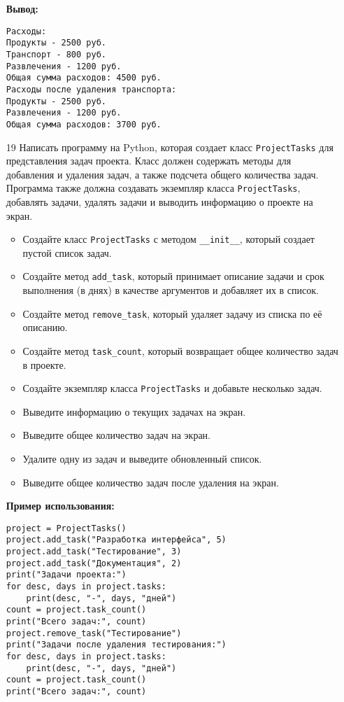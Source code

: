 \begin{enumerate}
\textbf{Вывод:}
\begin{verbatim}
Расходы:
Продукты - 2500 руб.
Транспорт - 800 руб.
Развлечения - 1200 руб.
Общая сумма расходов: 4500 руб.
Расходы после удаления транспорта:
Продукты - 2500 руб.
Развлечения - 1200 руб.
Общая сумма расходов: 3700 руб.
\end{verbatim}

\item[19] Написать программу на Python, которая создает класс \texttt{ProjectTasks} для представления задач проекта. Класс должен содержать методы для добавления и удаления задач, а также подсчета общего количества задач. Программа также должна создавать экземпляр класса \texttt{ProjectTasks}, добавлять задачи, удалять задачи и выводить информацию о проекте на экран.

\begin{itemize}
    \item Создайте класс \texttt{ProjectTasks} с методом \texttt{\_\_init\_\_}, который создает пустой список задач.
    \item Создайте метод \texttt{add\_task}, который принимает описание задачи и срок выполнения (в днях) в качестве аргументов и добавляет их в список.
    \item Создайте метод \texttt{remove\_task}, который удаляет задачу из списка по её описанию.
    \item Создайте метод \texttt{task\_count}, который возвращает общее количество задач в проекте.
    \item Создайте экземпляр класса \texttt{ProjectTasks} и добавьте несколько задач.
    \item Выведите информацию о текущих задачах на экран.
    \item Выведите общее количество задач на экран.
    \item Удалите одну из задач и выведите обновленный список.
    \item Выведите общее количество задач после удаления на экран.
\end{itemize}

\textbf{Пример использования:}

\begin{verbatim}
project = ProjectTasks()
project.add_task("Разработка интерфейса", 5)
project.add_task("Тестирование", 3)
project.add_task("Документация", 2)
print("Задачи проекта:")
for desc, days in project.tasks:
    print(desc, "-", days, "дней")
count = project.task_count()
print("Всего задач:", count)
project.remove_task("Тестирование")
print("Задачи после удаления тестирования:")
for desc, days in project.tasks:
    print(desc, "-", days, "дней")
count = project.task_count()
print("Всего задач:", count)
\end{verbatim}


\end{enumerate}
